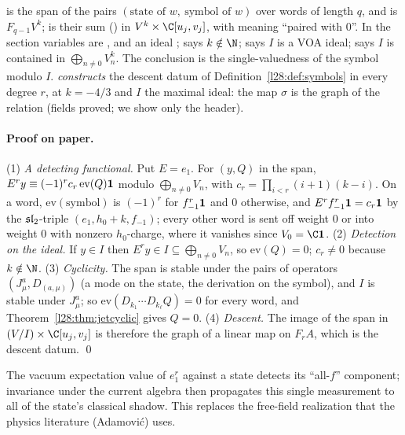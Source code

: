 \begin{dictionary}
 is the span of the pairs $(\text{state of }w,\ \text{symbol of }w)$ over words of length $q$, and  is
$F_{q-1}V^k$;  is their sum () in $V^k\times\C[u_j,v_j]$, with  meaning ``paired with $0$''. In
 the section variables are ,  and an ideal ;  says
$k\notin\N$;  says $I$ is a VOA ideal;  says $I$ is contained in $\bigoplus_{n\ne0}V^k_n$. The conclusion
 is the single-valuedness of the symbol modulo $I$.  \emph{constructs} the descent datum of
Definition~\ref{l28:def:symbols} in every degree $r$, at $k=-4/3$ and $I$ the maximal ideal: the map $\sigma$ is the graph of the relation (fields
proved; we show only the header).
\end{dictionary}

\paragraph{Proof on paper.} (1) \emph{A detecting functional.} Put $E=e_1$. For $(y,Q)$ in the span, $E^ry\equiv(-1)^rc_r\,\mathrm{ev}(Q)\mathbf 1$ modulo
$\bigoplus_{n\ne0}V_n$, with $c_r=\prod_{i<r}(i+1)(k-i)$. On a word, $\mathrm{ev}(\text{symbol})$ is $(-1)^r$ for $f_{-1}^r\mathbf 1$ and $0$ otherwise, and
$E^rf_{-1}^r\mathbf 1=c_r\mathbf 1$ by the $\mathfrak{sl}_2$-triple $(e_1,h_0+k,f_{-1})$; every other word is sent off weight $0$ or into weight $0$ with
nonzero $h_0$-charge, where it vanishes since $V_0=\C\ltwentyeightvac$. (2) \emph{Detection on the ideal.} If $y\in I$ then $E^ry\in I\subseteq\bigoplus_{n\ne0}V_n$,
so $\mathrm{ev}(Q)=0$; $c_r\ne0$ because $k\notin\N$. (3) \emph{Cyclicity.} The span is stable under the pairs of operators $(J^a_\mu,D_{(a,\mu)})$ (a mode on the
state, the derivation on the symbol), and $I$ is stable under $J^a_\mu$; so $\mathrm{ev}(D_{k_1}\cdots D_{k_\ell}Q)=0$ for every word, and
Theorem~\ref{l28:thm:jetcyclic} gives $Q=0$. (4) \emph{Descent.} The image of the span in $(V/I)\times\C[u_j,v_j]$ is therefore the graph of a linear map on
$F_rA$, which is the descent datum. \qed

\begin{physics}
The vacuum expectation value of $e_1^r$ against a state detects its ``all-$f$'' component; invariance under the current algebra then propagates this single
measurement to all of the state's classical shadow. This replaces the free-field realization that the physics literature (Adamović) uses.
\end{physics}

